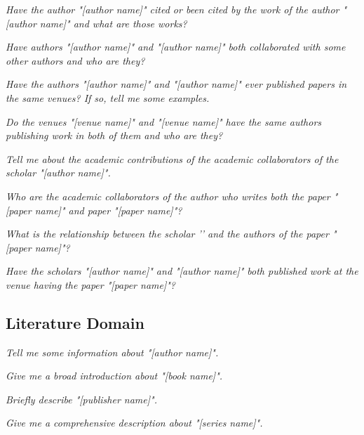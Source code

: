 
\squishlist
\item \textit{Have the author "[author name]" cited or been cited by the work of the author "[author name]" and what are those works?}
\item \textit{Have authors "[author name]" and "[author name]" both collaborated with some other authors and who are they?}
\item \textit{Have the authors "[author name]" and "[author name]" ever published papers in the same venues? If so, tell me some examples.}
\item \textit{Do the venues "[venue name]" and "[venue name]" have the same authors publishing work in both of them and who are they?}
\squishend


\squishlist
\item \textit{Tell me about the academic contributions of the academic collaborators of the scholar "[author name]".}
\item \textit{Who are the academic collaborators of the author who writes both the paper "[paper name]" and paper "[paper name]"?}
\item \textit{What is the relationship between the scholar '{}' and the authors of the paper "[paper name]"?}
\item \textit{Have the scholars "[author name]" and "[author name]" both published work at the venue having the paper "[paper name]"?}
\squishend

\subsection{Literature Domain}


\squishlist
\item \textit{Tell me some information about "[author name]".}
\item \textit{Give me a broad introduction about "[book name]".}
\item \textit{Briefly describe "[publisher name]".}
\item \textit{Give me a comprehensive description about "[series name]".}
\squishend


